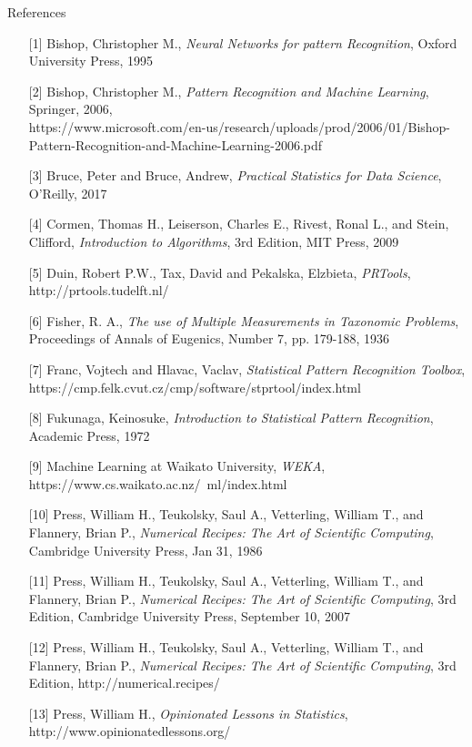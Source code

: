 \documentclass{article}
\begin{document}
\begin{enumerate}
\pagebreak

References

\begin{enumerate} 
	\item[{[1]}] Bishop, Christopher M., \textit{Neural Networks for pattern Recognition}, Oxford University Press, 1995 
	\item[{[2]}] Bishop, Christopher M., \textit{Pattern Recognition and Machine Learning}, Springer, 2006, \\
	https://www.microsoft.com/en-us/research/uploads/prod/2006/01/Bishop-Pattern-Recognition-and-Machine-Learning-2006.pdf
	\item[{[3]}] Bruce, Peter and Bruce, Andrew, \textit{Practical Statistics for Data Science}, O'Reilly, 2017
	\item[{[4]}] Cormen, Thomas H., Leiserson, Charles E., Rivest, Ronal L., and Stein, Clifford, \textit{Introduction to Algorithms}, 3rd Edition, MIT Press, 2009
	\item[{[5]}] Duin, Robert P.W., Tax, David and Pekalska, Elzbieta, \textit{PRTools}, http://prtools.tudelft.nl/
	\item[{[6]}] Fisher, R. A., \textit{The use of Multiple Measurements in Taxonomic Problems}, Proceedings of Annals of Eugenics, Number 7, pp. 179-188, 1936
	\item[{[7]}] Franc, Vojtech and Hlavac, Vaclav, \textit{Statistical Pattern Recognition Toolbox}, \newline https://cmp.felk.cvut.cz/cmp/software/stprtool/index.html
	\item[{[8]}] Fukunaga, Keinosuke, \textit{Introduction to Statistical Pattern Recognition}, Academic Press, 1972 
	\item[{[9]}] Machine Learning at Waikato University, \textit{WEKA}, https://www.cs.waikato.ac.nz/~ml/index.html
	\item[{[10]}] Press, William H., Teukolsky, Saul A., Vetterling, William T., and Flannery, Brian P.,  \textit{Numerical Recipes: The Art of Scientific Computing}, Cambridge University Press, Jan 31, 1986
	\item[{[11]}] Press, William H., Teukolsky, Saul A., Vetterling, William T., and Flannery, Brian P.,  \textit{Numerical Recipes: The Art of Scientific Computing}, 3rd Edition, Cambridge University Press, September 10, 2007
	\item[{[12]}] Press, William H., Teukolsky, Saul A., Vetterling, William T., and Flannery, Brian P.,  \textit{Numerical Recipes: The Art of Scientific Computing}, 3rd Edition, http://numerical.recipes/
	\item[{[13]}] Press, William H., \textit{Opinionated Lessons in Statistics}, http://www.opinionatedlessons.org/   
\end{enumerate}

\end{enumerate}
\end{document}
